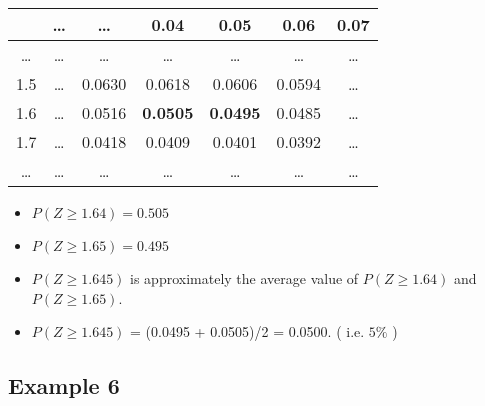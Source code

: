 \begin{table}[ht]

\centering %
\begin{tabular}{|c|| c c c c c c|} %
\hline %
& \ldots & \ldots & 0.04 & 0.05 &0.06&0.07 \\
\hline \hline%
\ldots & \ldots &\ldots &\ldots& \ldots &\ldots&\ldots \\ %
1.5 & \ldots & 0.0630&0.0618& 0.0606 &0.0594&\dots \\ %
1.6 & \ldots &0.0516& \textbf{0.0505} & \textbf{0.0495} &0.0485&\ldots\\
1.7 & \ldots &0.0418 &0.0409& 0.0401 &0.0392&\dots \\ %
\ldots & \ldots &\ldots &\ldots& \ldots &\ldots&\ldots \\ %
\hline %
\end{tabular}
\end{table}


\begin{itemize}
\item $ P(Z \geq 1.64) = 0.505$
\item $ P(Z \geq 1.65) = 0.495$ \bigskip
\item $ P(Z \geq 1.645)$ is approximately the average value of $ P(Z \geq 1.64)$ and $ P(Z \geq 1.65)$.
\item $ P(Z \geq 1.645)$ = (0.0495 + 0.0505)/2 = 0.0500. ( i.e. $5\%$ )
\end{itemize}

\newpage

\subsection*{Example 6}

